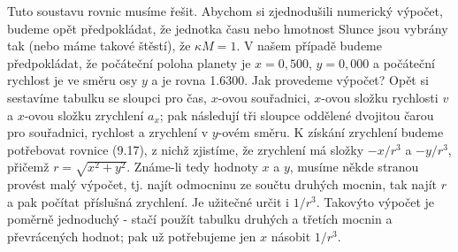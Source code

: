 {{    Tuto soustavu rovnic musíme řešit. Abychom si zjednodušili numerický výpočet, budeme opět 
    předpokládat, že jednotka času nebo hmotnost Slunce jsou vybrány tak (nebo máme takové štěstí), 
    že \(\kappa M = 1\). V našem případě budeme předpokládat, že počáteční poloha planety je \(x= 
    0,500\), \(y = 0,000\) a počáteční rychlost je ve směru osy \(y\) a je rovna \num{1.6300}. Jak 
    provedeme výpočet? Opět si sestavíme tabulku se sloupci pro čas, \(x\)-ovou souřadnici, 
    \(x\)-ovou složku rychlosti \(v\) a \(x\)-ovou složku zrychlení \(a_x\); pak následují tři 
    sloupce oddělené dvojitou čarou pro souřadnici, rychlost a zrychlení v \(y\)-ovém směru. K 
    získání zrychlení budeme potřebovat rovnice (9.17), z nichž zjistíme, že zrychlení má složky 
    \(-x/r^3\) a \(-y/r^3\), přičemž \(r=\sqrt{x^2 + y^2}\). Známe-li tedy hodnoty \(x\) a \(y\), 
    musíme někde stranou provést malý výpočet, tj. najít odmocninu ze součtu druhých mocnin, tak 
    najít \(r\) a pak počítat příslušná zrychlení. Je užitečné určit i \(1/r^3\). Takovýto výpočet 
    je poměrně jednoduchý - stačí použít tabulku druhých a třetích mocnin a převrácených hodnot; 
    pak už potřebujeme jen \(x\) násobit \(1/r^3\).
    
}}
